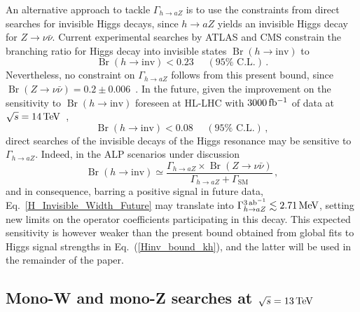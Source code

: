 \documentclass[11pt]{article}
\DeclareMathOperator{\Br}{Br}
\newcommand{\cl}{\%\,\,  \text{C.L.}}
\renewcommand{\to}{\rightarrow}
\renewcommand{\[}{\begin{equation}}
\renewcommand{\]}{\end{equation}}
\begin{document}
\vspace{2mm}

An alternative approach to tackle $\Gamma_{h \to aZ}$ is to use the constraints from direct searches for invisible Higgs decays, since $h \to a Z$ yields an invisible 
Higgs decay for $Z\to\nu\bar{\nu}$.
  Current experimental searches by ATLAS \cite{Aad:2015txa,Aad:2015pla} and CMS \cite{Chatrchyan:2014tja} 
constrain the branching ratio for Higgs decay into invisible states $\Br (h\to \text{inv})$ to~\cite{Aad:2015pla}
%
\begin{equation}
\Br (h\to \text{inv}) < 0.23 \quad\,\, 
(95\cl)\,.
\label{H_Invisible_Width_ATLAS}
\end{equation}
%
Nevertheless, no constraint on $\Gamma_{h \to aZ}$ follows from this present bound, since 
$\Br(Z \to \nu \bar\nu) = 0.2 \pm 0.006$~\cite{Olive:2016xmw}. In the future, given the improvement on the sensitivity to $\Br (h\to \text{inv})$ foreseen 
at HL-LHC with $\unit[3000]{fb^{-1}}$ of data at $\sqrt s=\unit[14]{TeV}$~\cite{ATL-PHYS-PUB-2013-014},
\begin{equation}
\label{H_Invisible_Width_Future}
\Br (h\to \text{inv}) < 0.08\quad\,\, (95\cl)\,,
\end{equation} 
 direct searches of the invisible decays of the Higgs resonance may be sensitive to $\Gamma_{h \to aZ}$. Indeed,    
in the ALP scenarios under discussion 
%
\begin{equation}
\Br (h\to \text{inv})\simeq\frac{\Gamma_{h \to a Z} \times \Br(Z \to \nu \bar\nu)}{\Gamma_{h \to a Z}+\Gamma_\text{SM}}\,,
\end{equation}
%
and in consequence, barring a positive signal in future data, Eq.~\eqref{H_Invisible_Width_Future} may translate into 
$\Gamma_{h \to aZ}^{\unit[3]{ab^{-1}}} \lesssim \unit[2.71]{MeV}$, setting new limits on the operator coefficients 
participating in this decay.
%
This expected sensitivity is however weaker than the present bound obtained from global fits to Higgs signal strengths in Eq.~(\ref{Hinv_bound_kh}), and  
the latter will be used in 
the remainder of the paper.




\subsection{Mono-W and mono-Z searches at $\sqrt{s}=\unit[13]{TeV}$}
\label{Sect:monoW_monoZ}
\end{document}
